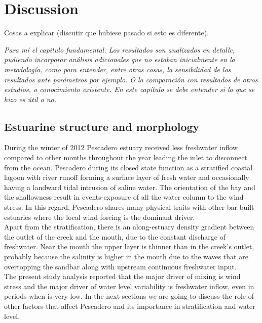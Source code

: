 \documentclass[tesis.tex]{subfiles}
\begin{document}
    
\section{Discussion}

Cosas a explicar (discutir que hubiese pasado si esto es diferente).

\textit{Para mí el capitulo fundamental. Los resultados son analizados en detalle, pudiendo incorporar análisis adicionales que no estaban inicialmente en la metodología, como para entender, entre otras cosas, la sensibilidad de los resultados ante parámetros por ejemplo. O la comparación con resultados de otros estudios, o conocimiento existente. En este capítulo se debe entender si lo que se hizo es útil o no.}

\subsection{Estuarine structure and morphology}

During the winter of 2012 Pescadero estuary received less freshwater inflow compared to other months throughout the year leading the inlet to disconnect from the ocean. Pescadero during its closed state function as a stratified coastal lagoon with river runoff forming a surface layer of fresh water and occasionally having a landward tidal intrusion of saline water. The orientation of the bay and the shallowness result in events-exposure of all the water column to the wind stress. In this regard, Pescadero shares many physical traits with other bar-built estuaries where the local wind forcing is the dominant driver.\\

Apart from the stratification, there is an along-estuary density gradient between the outlet of the creek and the mouth, due to the constant discharge of freshwater. Near the mouth the upper layer is thinner than in the creek's outlet, probably because the salinity is higher in the mouth due to the waves that are overtopping the sandbar along with upstream continuous freshwater input.\\

The present study analysis reported that the major driver of mixing is wind stress and the major driver of water level variability is freshwater inflow, even in periods when is very low. In the next sections we are going to discuss the role of other factors that affect Pescadero and its importance in stratification and water level.\\
\end{document}
